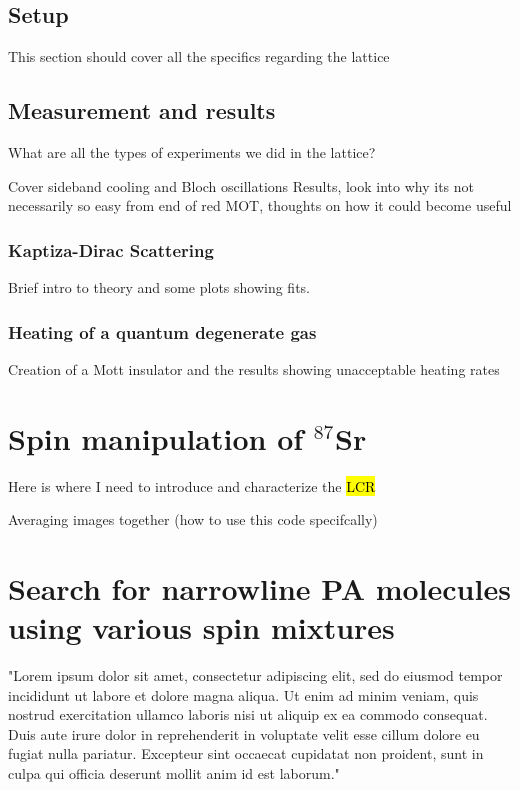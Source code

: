 \subsection{Setup}
\label{ssec:lattice_setup}

This section should cover all the specifics regarding the lattice

\subsection{Measurement and results}
\label{ssec:lattice_tests}

What are all the types of experiments we did in the lattice?

Cover sideband cooling and Bloch oscillations
Results, look into why its not necessarily so easy from end of red MOT, thoughts on how it could become useful

\subsubsection{Kaptiza-Dirac Scattering}
\label{sssec:sideband_cooling}

Brief intro to theory and some plots showing fits.

\subsubsection{Heating of a quantum degenerate gas}
\label{sssec:sideband_cooling}

Creation of a Mott insulator and the results showing unacceptable heating rates

\section{Spin manipulation of $^{87}$Sr}
\label{sec:spin_pol}

Here is where I need to introduce and characterize the \hl{LCR}

Averaging images together (how to use this code specifcally)

\section{Search for narrowline PA molecules using various spin mixtures}
\label{sec:87PAS}

"Lorem ipsum dolor sit amet, consectetur adipiscing elit, sed do eiusmod tempor incididunt ut labore et dolore magna aliqua. Ut enim ad minim veniam, quis nostrud exercitation ullamco laboris nisi ut aliquip ex ea commodo consequat. Duis aute irure dolor in reprehenderit in voluptate velit esse cillum dolore eu fugiat nulla pariatur. Excepteur sint occaecat cupidatat non proident, sunt in culpa qui officia deserunt mollit anim id est laborum."